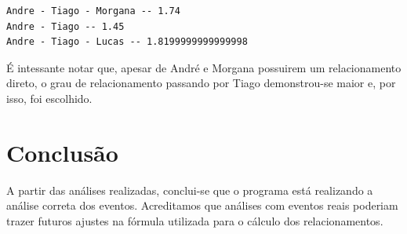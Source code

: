\documentclass[a4paper, twocolumn, 12pt]{article}
\begin{document}
\begin{verbatim}
Andre - Tiago - Morgana -- 1.74
Andre - Tiago -- 1.45
Andre - Tiago - Lucas -- 1.8199999999999998
\end{verbatim}

É intessante notar que, apesar de André e Morgana possuirem um relacionamento direto, o grau de relacionamento passando por Tiago demonstrou-se maior e, por isso, foi escolhido.


\section{Conclusão}

A partir das análises realizadas, conclui-se que o programa está realizando a análise correta dos eventos. Acreditamos que análises com eventos reais poderiam trazer futuros ajustes na fórmula utilizada para o cálculo dos relacionamentos.




\begin{small}
  
\end{small}
\end{document}

